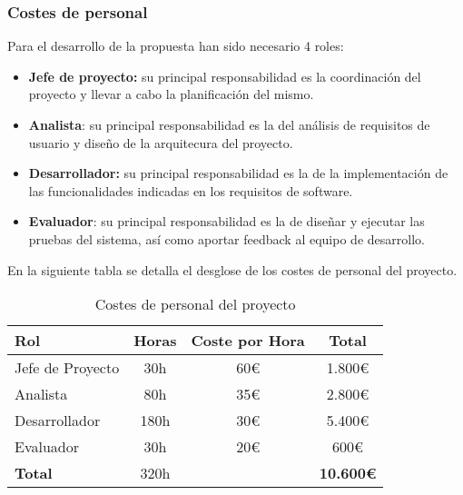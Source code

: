 \subsubsection{Costes de personal}
Para el desarrollo de la propuesta han sido necesario 4 roles: 
\begin{itemize}
    \item \textbf{Jefe de proyecto:} su principal responsabilidad es la coordinación del proyecto y llevar a cabo la planificación del mismo.
    \item \textbf{Analista}: su principal responsabilidad es la del análisis de requisitos de usuario y diseño de la arquitecura del proyecto.
    \item \textbf{Desarrollador:} su principal responsabilidad es la de la implementación de las funcionalidades indicadas en los requisitos de software.
    \item \textbf{Evaluador}: su principal responsabilidad es la de diseñar y ejecutar las pruebas del sistema, así como aportar feedback al equipo de desarrollo.
\end{itemize}

En la siguiente tabla se detalla el desglose de los costes de personal del proyecto.


\begin{table}[htbp]
    \centering
    \caption{Costes de personal del proyecto}
    \label{tab:costes_personal}
    \begin{tabular}{@{}lccc@{}}
    \toprule
    \textbf{Rol}     & \textbf{Horas} & \textbf{Coste por Hora} & \textbf{Total}   \\ \midrule
    Jefe de Proyecto & 30h            & 60\euro                 & 1.800\euro       \\
    Analista         & 80h            & 35\euro                 & 2.800\euro       \\
    Desarrollador    & 180h           & 30\euro                 & 5.400\euro       \\
    Evaluador        & 30h            & 20\euro                 & 600\euro         \\ \midrule
    \textbf{Total}   & 320h           &                         & \textbf{10.600\euro} \\ \bottomrule
    \end{tabular}
\end{table}

